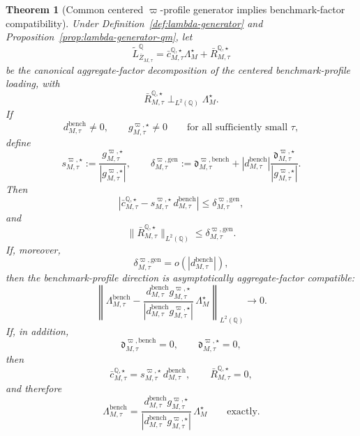 \documentclass[11pt,a4paper]{amsart}
\theoremstyle{plain}
\newtheorem{theorem}{Theorem}[section]
\theoremstyle{definition}
\theoremstyle{remark}
\newcommand{\QQ}{\mathbb{Q}}
\begin{document}
\begin{theorem}[Common centered \(\varpi\)-profile generator implies benchmark-factor compatibility]\label{thm:lambda-generator}
Under Definition~\ref{def:lambda-generator} and
Proposition~\ref{prop:lambda-generator-qm}, let
\[
        \widetilde L_{\bar Z_{M,\tau}}^\QQ
        =
        \bar c_{M,\tau}^{\QQ,\star}\Lambda_M^\star
        +
        \bar R_{M,\tau}^{\QQ,\star}
\]
be the canonical aggregate-factor decomposition of the centered benchmark-profile loading, with
\[
        \bar R_{M,\tau}^{\QQ,\star}\perp_{L^2(\QQ)}\Lambda_M^\star.
\]
If
\[
        d_{M,\tau}^{\mathrm{bench}}\neq0,
        \qquad
        g_{M,\tau}^{\varpi,\star}\neq0
        \qquad
        \text{for all sufficiently small }\tau,
\]
define
\[
        s_{M,\tau}^{\varpi,\star}
        :=
        \frac{g_{M,\tau}^{\varpi,\star}}{|g_{M,\tau}^{\varpi,\star}|},
        \qquad
        \delta_{M,\tau}^{\varpi,\mathrm{gen}}
        :=
        \mathfrak d_{M,\tau}^{\varpi,\mathrm{bench}}
        +
        |d_{M,\tau}^{\mathrm{bench}}|
        \frac{\mathfrak d_{M,\tau}^{\varpi,\star}}{|g_{M,\tau}^{\varpi,\star}|}.
\]
Then
\[
        \left|
                \bar c_{M,\tau}^{\QQ,\star}
                -
                s_{M,\tau}^{\varpi,\star}\,d_{M,\tau}^{\mathrm{bench}}
        \right|
        \le
        \delta_{M,\tau}^{\varpi,\mathrm{gen}},
\]
and
\[
        \|\bar R_{M,\tau}^{\QQ,\star}\|_{L^2(\QQ)}
        \le
        \delta_{M,\tau}^{\varpi,\mathrm{gen}}.
\]
If, moreover,
\[
        \delta_{M,\tau}^{\varpi,\mathrm{gen}}
        =
        o\!\left(|d_{M,\tau}^{\mathrm{bench}}|\right),
\]
then the benchmark-profile direction is asymptotically aggregate-factor compatible:
\[
        \left\|
                \Lambda_{M,\tau}^{\mathrm{bench}}
                -
                \frac{d_{M,\tau}^{\mathrm{bench}}g_{M,\tau}^{\varpi,\star}}
                {|d_{M,\tau}^{\mathrm{bench}}g_{M,\tau}^{\varpi,\star}|}\,
                \Lambda_M^\star
        \right\|_{L^2(\QQ)}
        \to0.
\]
If, in addition,
\[
        \mathfrak d_{M,\tau}^{\varpi,\mathrm{bench}}=0,
        \qquad
        \mathfrak d_{M,\tau}^{\varpi,\star}=0,
\]
then
\[
        \bar c_{M,\tau}^{\QQ,\star}
        =
        s_{M,\tau}^{\varpi,\star}\,d_{M,\tau}^{\mathrm{bench}},
        \qquad
        \bar R_{M,\tau}^{\QQ,\star}=0,
\]
and therefore
\[
        \Lambda_{M,\tau}^{\mathrm{bench}}
        =
        \frac{d_{M,\tau}^{\mathrm{bench}}g_{M,\tau}^{\varpi,\star}}
        {|d_{M,\tau}^{\mathrm{bench}}g_{M,\tau}^{\varpi,\star}|}\,
        \Lambda_M^\star
        \qquad
        \text{exactly.}
\]
\end{theorem}
\end{document}
